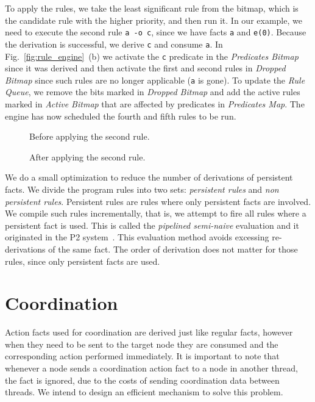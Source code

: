 To apply the rules, we take the least significant rule from the bitmap, which is
the candidate rule with the higher priority, and then run it. In our example, we
need to execute the second rule \texttt{a -o c}, since we have facts \texttt{a}
and \texttt{e(0)}.  Because the derivation is successful, we derive \texttt{c}
and consume \texttt{a}. In Fig.~\ref{fig:rule_engine}~(b) we activate the
\texttt{c} predicate in the \emph{Predicates Bitmap} since it was derived and
then activate the first and second rules in \emph{Dropped Bitmap} since such
rules are no longer applicable (\texttt{a} is gone). To update the \emph{Rule
   Queue}, we remove the bits marked in \emph{Dropped Bitmap} and add the active
   rules marked in \emph{Active Bitmap} that are affected by predicates in
   \emph{Predicates Map}. The engine has now scheduled the fourth and fifth
   rules to be run.

\begin{figure*}[h]
   \centering
   \begin{subfigure}[b]{0.4\textwidth}
      \caption{Before applying the second rule.}
   \end{subfigure}
   \begin{subfigure}[b]{0.4\textwidth}
      \caption{After applying the second rule.}
   \end{subfigure}
   \caption{Rule engine main data structures.}
   \label{fig:rule_engine}
\end{figure*}

We do a small optimization to reduce the number of derivations of persistent
facts. We divide the program rules into two sets: \emph{persistent rules} and
\emph{non persistent rules}.  Persistent rules are rules where only persistent
facts are involved. We compile such rules incrementally, that is, we attempt to
fire all rules where a persistent fact is used. This is called the
\emph{pipelined semi-naive} evaluation and it originated in the P2
system~\cite{Loo-condie-garofalakis-p2}.  This evaluation method avoids
excessing re-derivations of the same fact. The order of derivation does not
matter for those rules, since only persistent facts are used.

\section{Coordination}

Action facts used for coordination are derived just like regular facts, however when they need to be sent to the target node
they are consumed and the corresponding action performed immediately.
It is important to note that whenever a node sends a coordination action fact to a node in another thread,
the fact is ignored, due to the costs of sending
coordination data between threads. We intend to design an efficient mechanism to solve this problem.

